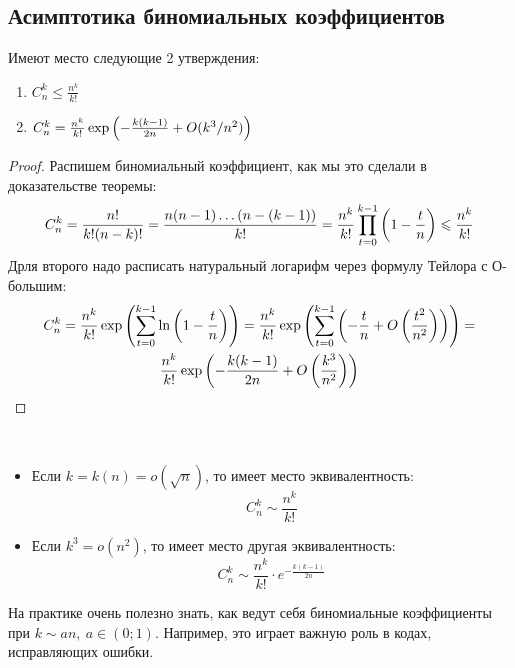 \subsection{Асимптотика биномиальных коэффициентов}

\begin{lemma}
	Имеют место следующие 2 утверждения:
	\begin{enumerate}
		\item \(C_n^k \le \frac{n^k}{k!}\)
		
		\item \(C_n^k = \frac{n^k}{k!} \exp \left(-\frac{k(k - 1)}{2n} + O(k^3 / n^2)\right)\)
	\end{enumerate}
\end{lemma}

\begin{proof}
	Распишем биномиальный коэффициент, как мы это сделали в доказательстве теоремы:
	\[
		C_n^k = \frac{n!}{k! (n - k)!} = \frac{n(n - 1) \ldots (n - (k - 1))}{k!} = \frac{n^k}{k!} \prod_{t = 0}^{k - 1} \left(1 - \frac{t}{n}\right) \leqslant \frac{n^k}{k!}
	\]
	Дрля второго надо расписать натуральный логарифм через формулу Тейлора с О-большим:
	\begin{multline*}
		C_n^k = \frac{n^k}{k!} \exp\left(\sum_{t = 0}^{k - 1} \ln\left(1 - \frac{t}{n}\right)\right) = \frac{n^k}{k!} \exp\left(\sum_{t = 0}^{k - 1} \left(-\frac{t}{n} + O\left(\frac{t^2}{n^2}\right)\right)\right) =
		\\
		\frac{n^k}{k!} \exp\left(-\frac{k(k - 1)}{2n} + O\left(\frac{k^3}{n^2}\right)\right)
	\end{multline*}
\end{proof}

\begin{corollary}~
	\begin{itemize}
		\item Если $k = k(n) = o(\sqrt{n})$, то имеет место эквивалентность:
		\[
			C_n^k \sim \frac{n^k}{k!}
		\]
		
		\item Если $k^3 = o(n^2)$, то имеет место другая эквивалентность:
		\[
			C_n^k \sim \frac{n^k}{k!} \cdot e^{-\frac{k(k - 1)}{2n}}
		\]
	\end{itemize}
\end{corollary}

\begin{note}
	На практике очень полезно знать, как ведут себя биномиальные коэффициенты при $k \sim an,\ a \in (0; 1)$. Например, это играет важную роль в кодах, исправляющих ошибки.
\end{note}

